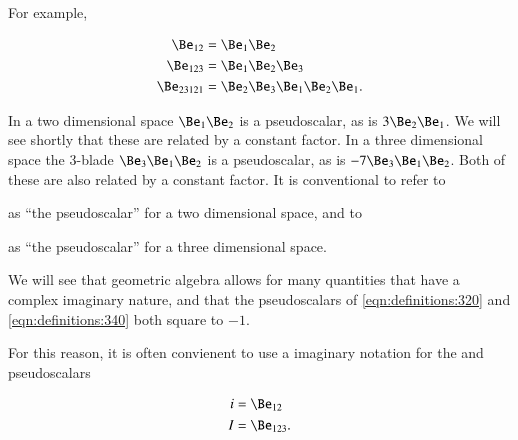 
For example,

\begin{equation}\label{eqn:multivector:360}
\begin{aligned}
\Be_{12} &= \Be_1 \Be_2 \\
\Be_{123} &= \Be_1 \Be_2 \Be_3 \\
\Be_{23121} &= \Be_2 \Be_3 \Be_1 \Be_2 \Be_1.
\end{aligned}
\end{equation}


In a two dimensional space \( \Be_1 \Be_2 \) is a pseudoscalar, as is \( 3 \Be_2 \Be_1 \).  We will see shortly that these are related by a constant factor.
In a three dimensional space the 3-blade
\( \Be_3 \Be_1 \Be_2 \) is a pseudoscalar, as is \( - 7 \Be_3 \Be_1 \Be_2 \).  Both of these are also related by a constant factor.
It is conventional to refer to


as ``the pseudoscalar'' for a two dimensional space, and to


as ``the pseudoscalar'' for a three dimensional space.

We will see that geometric algebra allows for many quantities that have a complex imaginary nature, and that the pseudoscalars of \cref{eqn:definitions:320} and \cref{eqn:definitions:340} both square to \(-1\).  

For this reason, it is often convienent to use a imaginary notation for the  and  pseudoscalars

\begin{dmath}\label{eqn:multivector_nomenclature:42}
\begin{aligned}
i &= \Be_{12} \\
I &= \Be_{123}.
\end{aligned}
\end{dmath}
